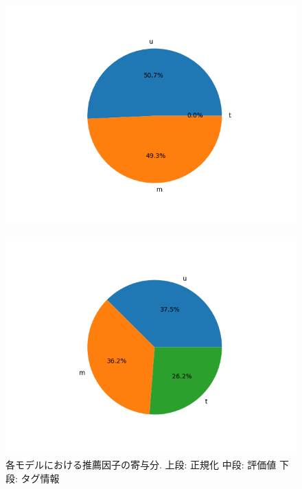 \documentclass[a4j,11pt]{jarticle}           %
\begin{document}
	\begin{figure}[h]
		\centering
		\includegraphics[bb=0 0 360 270, width=\hsize]{img/Figure_2.png}
	\end{figure}
	\begin{figure}[H]
		\centering
		\includegraphics[bb=0 0 360 270, width=\hsize]{img/Figure_3.png}
		\caption{各モデルにおける推薦因子の寄与分. 上段: 正規化 中段: 評価値 下段: タグ情報 }
	\end{figure}
\end{document}
